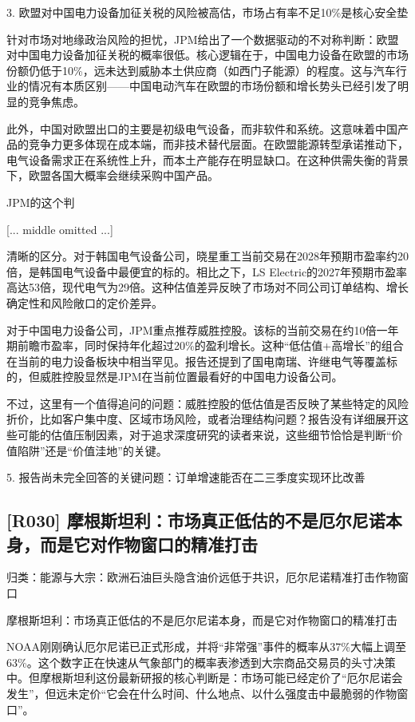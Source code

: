 \documentclass[11pt]{ctexart}
\begin{document}
3. 欧盟对中国电力设备加征关税的风险被高估，市场占有率不足10\%是核心安全垫

针对市场对地缘政治风险的担忧，JPM给出了一个数据驱动的不对称判断：欧盟对中国电力设备加征关税的概率很低。核心逻辑在于，中国电力设备在欧盟的市场份额仍低于10\%，远未达到威胁本土供应商（如西门子能源）的程度。这与汽车行业的情况有本质区别——中国电动汽车在欧盟的市场份额和增长势头已经引发了明显的竞争焦虑。

此外，中国对欧盟出口的主要是初级电气设备，而非软件和系统。这意味着中国产品的竞争力更多体现在成本端，而非技术替代层面。在欧盟能源转型承诺推动下，电气设备需求正在系统性上升，而本土产能存在明显缺口。在这种供需失衡的背景下，欧盟各国大概率会继续采购中国产品。

JPM的这个判

[... middle omitted ...]

清晰的区分。对于韩国电气设备公司，晓星重工当前交易在2028年预期市盈率约20倍，是韩国电气设备中最便宜的标的。相比之下，LS Electric的2027年预期市盈率高达53倍，现代电气为29倍。这种估值差异反映了市场对不同公司订单结构、增长确定性和风险敞口的定价差异。

对于中国电力设备公司，JPM重点推荐威胜控股。该标的当前交易在约10倍一年期前瞻市盈率，同时保持年化超过20\%的盈利增长。这种“低估值+高增长”的组合在当前的电力设备板块中相当罕见。报告还提到了国电南瑞、许继电气等覆盖标的，但威胜控股显然是JPM在当前位置最看好的中国电力设备公司。

不过，这里有一个值得追问的问题：威胜控股的低估值是否反映了某些特定的风险折价，比如客户集中度、区域市场风险，或者治理结构问题？报告没有详细展开这些可能的估值压制因素，对于追求深度研究的读者来说，这些细节恰恰是判断“价值陷阱”还是“价值洼地”的关键。

5. 报告尚未完全回答的关键问题：订单增速能否在二三季度实现环比改善

\subsection{[R030] 摩根斯坦利：市场真正低估的不是厄尔尼诺本身，而是它对作物窗口的精准打击}
{\small\color{refgray}归类：能源与大宗：欧洲石油巨头隐含油价远低于共识，厄尔尼诺精准打击作物窗口}

摩根斯坦利：市场真正低估的不是厄尔尼诺本身，而是它对作物窗口的精准打击

NOAA刚刚确认厄尔尼诺已正式形成，并将“非常强”事件的概率从37\%大幅上调至63\%。这个数字正在快速从气象部门的概率表渗透到大宗商品交易员的头寸决策中。但摩根斯坦利这份最新研报的核心判断是：市场可能已经定价了“厄尔尼诺会发生”，但远未定价“它会在什么时间、什么地点、以什么强度击中最脆弱的作物窗口”。
\end{document}

